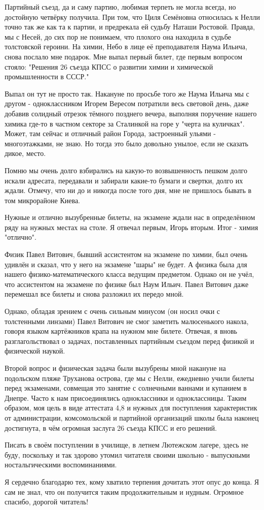 Партийный съезд, да и
саму партию, любимая терпеть не могла всегда, но достойную четвёрку получила.
При том, что Циля Семёновна относилась к Нелли точно так же как та к партии,
и предрекала ей судьбу Наташи Ростовой. Правда, мы с Несей, до сих пор не
понимаем, что плохого она находила в судьбе толстовской героини. На химии,
Небо в лице её преподавателя Наума Ильича, снова послало мне подарок. Мне
выпал первый билет, где первым вопросом стояло: "Решения 26 съезда КПСС о
развитии химии и химической промышленности в СССР." 

Выпал он тут не просто так. Накануне по просьбе того же Наума Ильича мы с
другом - одноклассником Игорем Вересом потратили весь световой день, даже
добавив солидный отрезок тёмного позднего вечера, выполняя поручение нашего
химика где-то в частном секторе за Сталинкой на горе у "черта на куличках".
Может, там сейчас и отличный район Города, застроенный ульями - многоэтажками,
не знаю. Но тогда это было довольно унылое, если не сказать дикое, место. 

Помню мы очень долго взбирались на какую-то возвышенность пешком долго искали
адресата, передавали и забирали какие-то бумаги и свертки, долго их ждали.
Отмечу, что ни до и никогда после того дня, мне не пришлось бывать в том
микрорайоне Киева.

Нужные и отлично вызубренные билеты, на экзамене ждали нас в определённом ряду
на нужных местах на столе. Я отвечал первым, Игорь вторым. Итог - химия
"отлично". 

Физик Павел Витович, бывший ассистентом на экзамене по химии, был очень удивлён
и сказал, что у него на экзамене "шары" не будет. А физика была для нашего
физико-математического класса ведущим предметом. Однако он не учёл, что
ассистентом на экзамене по физике был Наум Ильич. Павел Витович даже перемешал
все билеты и снова разложил их передо мной. 

Однако, обладая зрением с очень сильным минусом (он носил очки с толстенными
линзами) Павел Витович не смог заметить малюсенького накола, говоря языком
картёжников крапа на нужном мне билете. Отвечая, я вновь разглагольствовал о
задачах, поставленных партийным съездом перед физикой и физической наукой. 

Второй вопрос и физическая задача были вызубрены мной накануне на подольском
пляже Труханова острова, где мы с Нелли, ежедневно учили билеты перед
экзаменами, совмещая это занятие с солнечными ваннами и купанием в Днепре.
Часто к нам присоединялись одноклассники и одноклассницы. Таким образом, моя
цель в виде аттестата 4,8 и нужных для поступления характеристик от
администрации, комсомольской и партийной организаций школы была наконец
достигнута, в чём огромная заслуга 26 съезда КПСС и его решений. 

Писать в своём поступлении в училище, в летнем Лютежском лагере, здесь не буду,
поскольку и так здорово утомил читателя своими школьно - выпускными
ностальгическими воспоминаниями.

Я сердечно благодарю тех, кому хватило терпения дочитать этот опус до конца.  Я
сам не знал, что он получится таким продолжительным и нудным. Огромное спасибо,
дорогой читатель!

